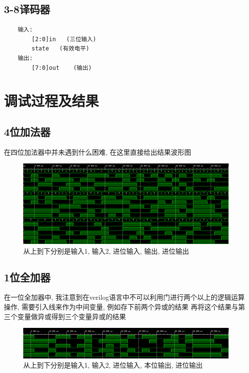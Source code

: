 \documentclass[fontset=windows,12pt]{article}
\begin{document}
    \subsection{3-8译码器}
    {\setmainfont{Courier New Bold}                          %
    \begin{lstlisting}
    输入:
        [2:0]in   (三位输入)
        state   (有效电平)
    输出:
        [7:0]out    (输出)
    \end{lstlisting}}

\section{调试过程及结果}
    \subsection{4位加法器}
        在四位加法器中并未遇到什么困难, 在这里直接给出结果波形图
        \begin{figure}[ht]
            \centering
            \includegraphics[width=1\textwidth]{add4.jpg}
            \caption{从上到下分别是输入1, 输入2, 进位输入, 输出, 进位输出}
            \label{3to8decoder}
        \end{figure}\par
    \subsection{1位全加器}
        在一位全加器中, 我注意到在verilog语言中不可以利用门进行两个以上的逻辑运算操作, 需要引入线来作为中间变量, 例如存下前两个异或的结果
        再将这个结果与第三个变量做异或得到三个变量异或的结果
        \begin{figure}[ht]
            \centering
            \includegraphics[width=1\textwidth]{add1.jpg}
            \caption{从上到下分别是输入1, 输入2, 进位输入, 本位输出, 进位输出}
            \label{3to8decoder}
        \end{figure}\par
\end{document}
